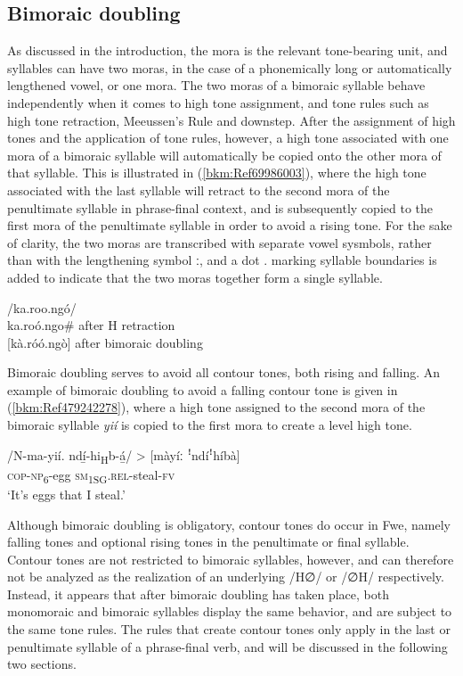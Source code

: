 \subsection{Bimoraic doubling}
\label{bkm:Ref432074325}\hypertarget{Toc75352620}{}\label{bkm:Ref486506295}
As discussed in the introduction, the mora is the relevant tone-bearing unit, and syllables can have two moras, in the case of a phonemically long or automatically lengthened vowel, or one mora. The two moras of a bimoraic syllable behave independently when it comes to high tone assignment, and tone rules such as high tone retraction, Meeussen’s Rule and downstep. After the assignment of high tones and the application of tone rules, however, a high tone associ\-ated with one mora of a bimoraic syllable will automatically be copied onto the other mora of that syllable. This is illustrated in (\ref{bkm:Ref69986003}), where the high tone associated with the last syllable will retract to the second mora of the penultimate syllable in phrase-final context, and is subsequently copied to the first mora of the penultimate syllable in order to avoid a rising tone. For the sake of clarity, the two moras are transcribed with separate vowel sysmbols, rather than with the lengthening symbol ː, and a dot . marking syllable boundaries is added to indicate that the two moras together form a single syllable.

\ea
\label{bkm:Ref69986003}
/ka.roo.ngó/\\
ka.roó.ngo\#  after H retraction\\
{[kà.róó.ngò]}  after bimoraic doubling
\z

Bimoraic doubling serves to avoid all contour tones, both rising and falling. An example of bi\-moraic doubling to avoid a falling contour tone is given in (\ref{bkm:Ref479242278}), where a high tone assigned to the second mora of the bimoraic syllable \textit{yií} is copied to the first mora to create a level high tone.

\ea
\label{bkm:Ref479242278}
\gll /N-ma-yií.    ndí̲-hi\textsubscript{H}b-á̲/ > [màyíː ꜝndíꜝhíbà]\\
\textsc{cop}-\textsc{np}\textsubscript{6}-egg    \textsc{sm}\textsubscript{1SG}.\textsc{rel}-steal-\textsc{fv}\\
\glt ‘It’s eggs that I steal.’
\z

Although bimoraic doubling is obligatory, contour tones do occur in Fwe, namely falling tones and optional rising tones in the penultimate or final syllable. Contour tones are not re\-stricted to bimoraic syllables, however, and can therefore not be analyzed as the realization of an underlying /H∅/ or /∅H/ respectively. Instead, it appears that after bimoraic doubling has taken place, both monomoraic and bimoraic syllables display the same behavior, and are subject to the same tone rules. The rules that create contour tones only apply in the last or penultimate syllable of a phrase-final verb, and will be discussed in the following two sections.

